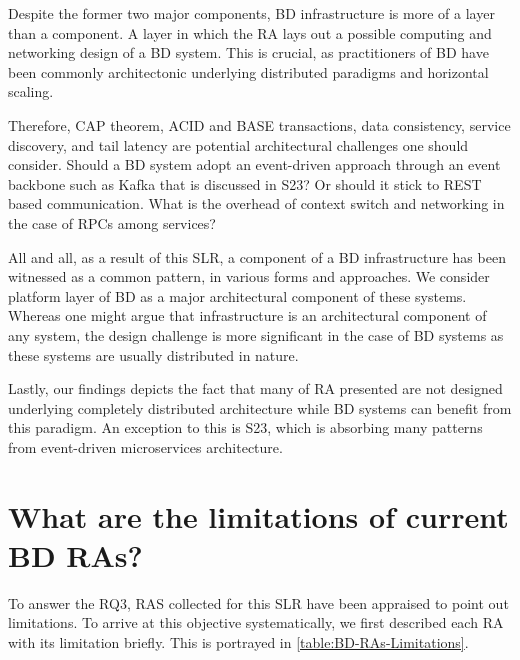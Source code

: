 \documentclass[review]{elsarticle}
\begin{document}
Despite the former two major components, BD infrastructure is more of a layer than a component. A layer in which the RA lays out a possible computing and networking design of a BD system. This is crucial, as practitioners of BD have been commonly architectonic underlying distributed paradigms and horizontal scaling. 

Therefore, CAP theorem, ACID and BASE transactions, data consistency, service discovery, and tail latency are potential architectural challenges one should consider. Should a BD system adopt an event-driven approach through an event backbone such as Kafka that is discussed in S23? Or should it stick to REST based communication. What is the overhead of context switch and networking in the case of RPCs among services?  

All and all, as a result of this SLR, a component of a BD infrastructure has been witnessed as a common pattern, in various forms and approaches. We consider platform layer of BD as a major architectural component of these systems. Whereas one might argue that infrastructure is an architectural component of any system, the design challenge is more significant in the case of BD systems as these systems are usually distributed in nature. 

Lastly, our findings depicts the fact that many of RA presented are not designed underlying completely distributed architecture while BD systems can benefit from this paradigm. An exception to this is S23, which is absorbing many patterns from event-driven microservices architecture.

\section{What are the limitations of current BD RAs?}

To answer the RQ3, RAS collected for this SLR have been appraised to point out limitations. To arrive at this objective systematically, we first described each RA with its limitation briefly. This is portrayed in \ref{table:BD-RAs-Limitations}.
\end{document}
